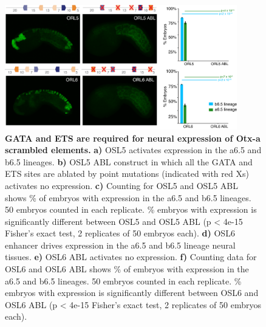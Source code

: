 \begin{figure}[p]
    \centering
    \includegraphics[width=0.9\textwidth]{2_figures-and-files/SuppFig4.png}
    \caption[GATA and ETS are required for neural expression of Otx-a scrambled elements.]{\textbf{GATA and ETS are required for neural expression of Otx-a scrambled elements.} \textbf{a)} OSL5 activates expression in the a6.5 and b6.5 lineages. \textbf{b)} OSL5 ABL construct in which all the GATA and ETS sites are ablated by point mutations (indicated with red Xs) activates no expression. \textbf{c)} Counting for OSL5 and OSL5 ABL shows \% of embryos with expression in the a6.5 and b6.5 lineages. 50 embryos counted in each replicate. \% embryos with expression is significantly different between OSL5 and OSL5 ABL (p < 4e-15 Fisher’s exact test, 2 replicates of 50 embryos each). \textbf{d)} OSL6 enhancer drives expression in the a6.5 and b6.5 lineage neural tissues. \textbf{e)} OSL6 ABL activates no expression. \textbf{f)} Counting data for OSL6 and OSL6 ABL shows \% of embryos with expression in the a6.5 and b6.5 lineages. 50 embryos counted in each replicate. \% embryos with expression is significantly different between OSL6 and OSL6 ABL (p < 4e-15 Fisher’s exact test, 2 replicates of 50 embryos each).}
    \label{fig:2 supplementary_4}
\end{figure}

